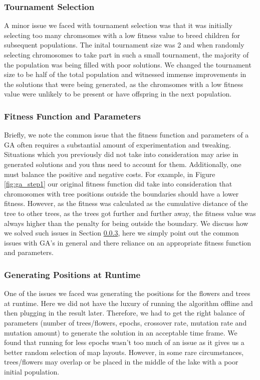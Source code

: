 \subsubsection{Tournament Selection}
A minor issue we faced with tournament selection was that it was initially selecting too many
chromsomes with a low fitness value to breed children for subsequent populations. The inital tournament
size was 2 and when randomly selecting chromosomes to take part in such a small tournament, the majority of the 
population was being filled with poor solutions. We changed the tournament size to be half of the total 
population and witnessed immense improvements in the solutions that were being generated, as the chromsomes with 
a low fitness value were unlikely to be present or have offspring in the next population.

\subsubsection{Fitness Function and Parameters}
Briefly, we note the common issue that the fitness function and parameters of a GA often requires a 
substantial amount of experimentation and tweaking. Situations which you 
previously did not take into consideration may arise in generated solutions and you thus need to account for 
them. Additionally, one must balance the positive and negative costs. For example, in Figure \ref{fig:ga_step1}
our original fitness function did take into consideration that chromosomes with tree positions outside the 
boundaries should have a lower fitness. However, as the fitness was calculated as the cumulative distance
of the tree to other trees, as the trees got further and further away, the fitness value was always higher
than the penalty for being outside the boundary. We discuss how we solved such issues in Section 
\ref{sec:runtimeIssues}, here we simply point out the common issues with GA's in general and there
reliance on an appropriate fitness function and parameters.

\subsubsection{Generating Positions at Runtime} \label{sec:runtimeIssues}
One of the issues we faced was generating the positions for the flowers and trees at runtime. Here we did not
have the luxury of running the algorithm offline and then plugging in the result later. Therefore,
we had to get the right balance of parameters (number of trees/flowers, epochs, crossover rate, mutation rate 
and mutation amount) to generate the solution in an acceptable time frame. We found that running for less epochs 
wasn't too much of an issue as it gives us a better random selection of map layouts. However, in some
rare circumstances, trees/flowers may overlap or be placed in the middle of the lake with a poor initial
population.

